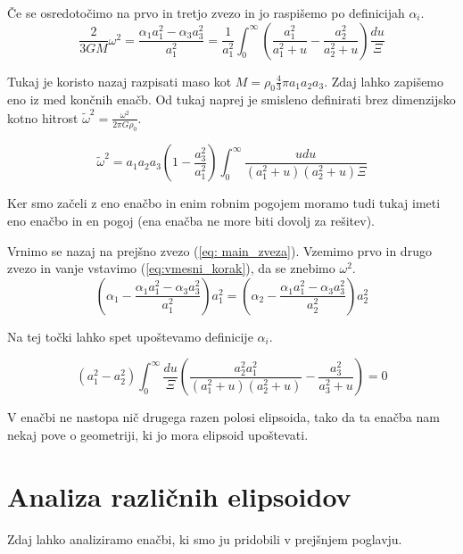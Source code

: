 \documentclass{article}
\theoremstyle{definition}
\theoremstyle{plain}
\numberwithin{definition}{section}
\numberwithin{theorem}{section}
\begin{document}
Če se osredotočimo na prvo in tretjo zvezo in jo raspišemo po definicijah $\alpha_i$.
\begin{equation}
	\frac{2}{3GM}\omega^2 = \frac{\alpha_1 a_1^2 - \alpha_3 a_3^2}{a_1^2} = 
	\frac{1}{a_1^2} \int_0^{\infty}  
	\left( \frac{a_1^2}{a_1^2 + u} - \frac{a_2^2}{a_2^2 + u} \right) \frac{du}{\Xi}
	\label{eq:vmesni_korak}
\end{equation}

Tukaj je koristo nazaj razpisati maso kot 
$M = \rho_{0} \frac{4}{3} \pi a_1 a_2 a_3$. 
Zdaj lahko zapišemo eno iz med končnih enačb. Od tukaj naprej je smisleno
definirati brez dimenzijsko kotno hitrost 
$\tilde{\omega}^2 = \frac{\omega^2}{2 \pi G \rho_0}$.

\begin{equation}
	\tilde{\omega}^2 =
	a_1 a_2 a_3 \left(1-\frac{a_3^2}{a_1^2}\right) \int_0^{\infty} 
	\frac{u du}{(a_1^2 + u)(a_2^2 + u)\Xi}
	\label{eq:1_koncna}
\end{equation}

Ker smo začeli z eno enačbo in enim robnim pogojem moramo tudi tukaj imeti 
eno enačbo in en pogoj (ena enačba ne more biti dovolj za rešitev).

Vrnimo se nazaj na prejšno zvezo (\ref{eq: main_zveza}). 
Vzemimo prvo in drugo zvezo in vanje vstavimo (\ref{eq:vmesni_korak}), 
da se znebimo $\omega^2$.
\begin{equation}
	\left(\alpha_1 - \frac{\alpha_1 a_1^2 - \alpha_3 a_3^2}{a_1^2}\right)a_1^2 = 
	\left(\alpha_2 - \frac{\alpha_1 a_1^2 - \alpha_3 a_3^2}{a_2^2}\right)a_2^2  
	\label{eq:vmesni_korak_2}
\end{equation}

Na tej točki lahko spet upoštevamo definicije $\alpha_i$.

\begin{equation}
	(a_1^2 - a_2^2) \int_0^{\infty} \frac{du}{\Xi}
	\left( \frac{a_2^2 a_1^2}{(a_1^2 + u)(a_2^2 + u)} - 
	\frac{a_3^2}{a_3^2 + u} \right) = 0
	\label{eq:2_koncna}
\end{equation}

V enačbi ne nastopa nič drugega razen polosi elipsoida, tako da ta enačba nam 
nekaj pove o geometriji, ki jo mora elipsoid upoštevati.

\section{Analiza različnih elipsoidov}
Zdaj lahko analiziramo enačbi, ki smo ju pridobili v prejšnjem poglavju.
\end{document}
